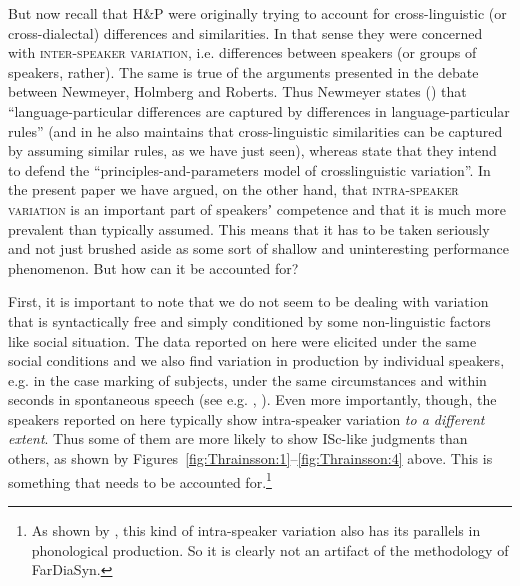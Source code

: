 \documentclass[output=paper]{LSP/langsci}
\begin{document}
But now recall that H{\&}P were originally trying to account for cross-linguistic (or cross-dialectal) differences and similarities. In that sense they were concerned with \textsc{inter-speaker variation}, i.e. differences between speakers (or groups of speakers, rather). The same is true of the arguments presented in the debate between Newmeyer, Holmberg and Roberts. Thus Newmeyer states (\citeyear[183]{Newmeyer2004}) that “language-particular differences are captured by differences in language-particular rules” (and in \citeyear{Newmeyer2006} he also maintains that cross-linguistic similarities can be captured by assuming similar rules, as we have just seen), whereas \citet[538]{Roberts2005} state that they intend to defend the “principles-and-para\-meters model of crosslinguistic variation”. In the present paper we have argued, on the other hand, that \textsc{intra-speaker variation} is an important part of speakersʼ competence and that it is much more prevalent than typically assumed. This means that it has to be taken seriously and not just brushed aside as some sort of shallow and uninteresting performance phenomenon. But how can it be accounted for?

First, it is important to note that we do not seem to be dealing with variation that is syntactically free and simply conditioned by some non-linguistic factors like social situation. The data reported on here were elicited under the same social conditions and we also find variation in production by individual speakers, e.g. in the case marking of subjects, under the same circumstances and within seconds in spontaneous speech (see e.g. \citealt[236]{Jónsson2005}, \citealt[7]{Nowenstein2014}). Even more importantly, though, the  speakers reported on here typically show intra-speaker variation \textit{to a different extent}. Thus some of them are more likely to show ISc-like judgments than others, as shown by Figures~\ref{fig:Thrainsson:1}--\ref{fig:Thrainsson:4} above. This is something that needs to be accounted for.\footnote{As shown by \citet[182--184]{Thráinsson2013variation}, this kind of intra-speaker variation also has its parallels in phonological production. So it is clearly not an artifact of the methodology of FarDiaSyn.}
\end{document}
